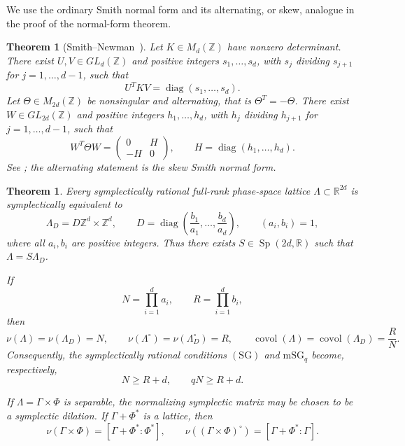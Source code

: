 \documentclass[11pt,reqno]{amsart}
\numberwithin{equation}{section}
\newtheorem{theorem}{Theorem}[section]
\newtheorem*{unnumberedtheorem}{Theorem}
\theoremstyle{definition}
\theoremstyle{remark}
\newcommand{\R}{\mathbb R}
\newcommand{\Z}{\mathbb Z}
\newcommand{\covol}{\operatorname{covol}}
\newcommand{\SG}{\ensuremath{(\mathrm{SG})}\xspace}
\newcommand{\mSG}{\mathrm{mSG}}
\newcommand{\Sp}{\operatorname{Sp}}
\begin{document}
We use the ordinary Smith normal form and its alternating, or skew,
analogue in the proof of the normal-form theorem.

\begin{unnumberedtheorem}[Smith--Newman~\protect\cite{Newman1972}]
Let $K\in M_d(\Z)$ have nonzero determinant.  There exist
$U,V\in GL_d(\Z)$ and positive integers
$s_1,\ldots,s_d$, with $s_j$ dividing $s_{j+1}$ for
$j=1,\ldots,d-1$, such that
\[
 U^T K V=\operatorname{diag}(s_1,\ldots,s_d).
\]
Let $\Theta\in M_{2d}(\Z)$ be nonsingular and alternating, that is $\Theta^T=-\Theta$.  There exist
$W\in GL_{2d}(\Z)$ and positive integers
$h_1,\ldots,h_d$, with $h_j$ dividing $h_{j+1}$ for
$j=1,\ldots,d-1$, such that
\[
 W^T\Theta W
 =\begin{pmatrix}0&H\\-H&0\end{pmatrix},
 \qquad H=\operatorname{diag}(h_1,\ldots,h_d).
\]
See \cite[Chapters~II and~IV]{Newman1972}; the alternating statement is the
skew Smith normal form.
\end{unnumberedtheorem}

\begin{theorem}
\label{thm:diagonal-symplectic-normal-form}
Every symplectically rational full-rank phase-space lattice
$\Lambda\subset\R^{2d}$ is symplectically equivalent to
\begin{equation}\label{eq:normal-form-lattice}
 \Lambda_D=D\Z^d\times\Z^d,
 \qquad
 D=\operatorname{diag}\left(\frac{b_1}{a_1},\ldots,
                             \frac{b_d}{a_d}\right),
 \qquad (a_i,b_i)=1,
\end{equation}
where all $a_i,b_i$ are positive integers.  Thus there exists
$S\in\Sp(2d,\R)$ such that $\Lambda=S\Lambda_D$.

If
\[
 N=\prod_{i=1}^d a_i,
 \qquad
 R=\prod_{i=1}^d b_i,
\]
then
\begin{equation}\label{eq:normal-form-invariants}
 \nu(\Lambda)=\nu(\Lambda_D)=N,
 \qquad
 \nu(\Lambda^\circ)=\nu(\Lambda_D^\circ)=R,
 \qquad
 \covol(\Lambda)=\covol(\Lambda_D)=\frac{R}{N}.
\end{equation}
Consequently, the symplectically rational conditions $\SG$ and $\mSG_q$
become, respectively,
\[
                             N\ge R+d,
 \qquad
                             qN\ge R+d.
\]

If $\Lambda=\Gamma\times\Phi$ is separable, the normalizing symplectic
matrix may be chosen to be a symplectic dilation.  If $\Gamma+\Phi^*$ is a
lattice, then
\[
 \nu(\Gamma\times\Phi)=[\Gamma+\Phi^*:\Phi^*],
 \qquad
 \nu((\Gamma\times\Phi)^\circ)=[\Gamma+\Phi^*:\Gamma].
\]
\end{theorem}
\end{document}

